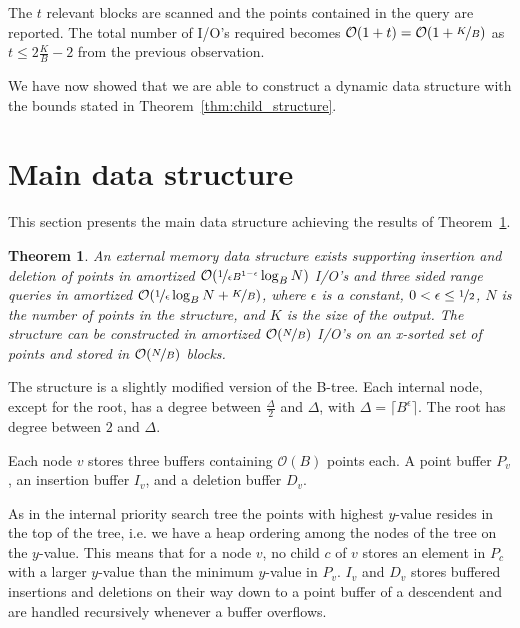 \documentclass[twoside,11pt,openright]{report}
\newtheorem{theorem}{Theorem}
\begin{document}
The $t$ relevant blocks are scanned and the points contained in the query are reported. The total number of I/O's required becomes $\mathcal{O}(1+t) = \mathcal{O}(1+\nicefrac{K}{B})$ as $t \leq 2\frac{K}{B}-2$ from the previous observation.

We have now showed that we are able to construct a dynamic data structure with the bounds stated in Theorem~\ref{thm:child_structure}.


\section{Main data structure}
\label{sec:main_data_structure}
This section presents the main data structure achieving the results of Theorem~\ref{thm:main_structure}.
\begin{theorem}
\label{thm:main_structure}
An external memory data structure exists supporting insertion and deletion of points in amortized $\mathcal{O}(\nicefrac{1}{\epsilon B^{1-\epsilon}} \log_B N)$ I/O's and three sided range queries in amortized $\mathcal{O}(\nicefrac{1}{\epsilon} \log_B N + \nicefrac{K}{B})$, where $\epsilon$ is a constant, $0 < \epsilon \leq \nicefrac{1}{2}$, $N$ is the number of points in the structure, and $K$ is the size of the output. The structure can be constructed in amortized $\mathcal{O}(\nicefrac{N}{B})$ I/O's on an x-sorted set of points and stored in $\mathcal{O}(\nicefrac{N}{B})$ blocks.
\end{theorem}

The structure is a slightly modified version of the B-tree. Each internal node, except for the root, has a degree between $\frac{\Delta}{2}$ and $\Delta$, with $\Delta = \lceil B^\epsilon \rceil$. The root has degree between $2$ and $\Delta$.

Each node $v$ stores three buffers containing $\mathcal{O}(B)$ points each. A point buffer $P_v$, an insertion buffer $I_v$, and a deletion buffer $D_v$.

As in the internal priority search tree the points with highest $y$-value resides in the top of the tree, i.e. we have a heap ordering among the nodes of the tree on the $y$-value. This means that for a node $v$, no child $c$ of $v$ stores an element in $P_c$ with a larger $y$-value than the minimum $y$-value in $P_v$.
$I_v$ and $D_v$ stores buffered insertions and deletions on their way down to a point buffer of a descendent and are handled recursively whenever a buffer overflows.
\end{document}
